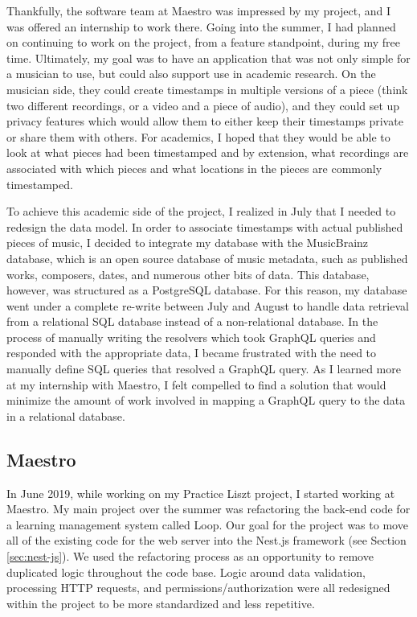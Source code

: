 Thankfully, the software team at Maestro was impressed by my project, and I was offered an internship to work there. Going into the summer, I had planned on continuing to work on the project, from a feature standpoint, during my free time.  Ultimately, my goal was to have an application that was not only simple for a musician to use, but could also support use in academic research. On the musician side, they could create timestamps in multiple versions of a piece (think two different recordings, or a video and a piece of audio), and they could set up privacy features which would allow them to either keep their timestamps private or share them with others.  For academics, I hoped that they would be able to look at what pieces had been timestamped and by extension, what recordings are associated with which pieces and what locations in the pieces are commonly timestamped.

To achieve this academic side of the project, I realized in July that I needed to redesign the data model.  In order to associate timestamps with actual published pieces of music, I decided to integrate my database with the MusicBrainz database, which is an open source database of music metadata, such as published works, composers, dates, and numerous other bits of data.  This database, however, was structured as a PostgreSQL database.  For this reason, my database went under a complete re-write between July and August to handle data retrieval from a relational SQL database instead of a non-relational database.  In the process of manually writing the resolvers which took GraphQL queries and responded with the appropriate data, I became frustrated with the need to manually define SQL queries that resolved a GraphQL query.  As I learned more at my internship with Maestro, I felt compelled to find a solution that would minimize the amount of work involved in mapping a GraphQL query to the data in a relational database.

\subsection{Maestro}
In June 2019, while working on my Practice Liszt project, I started working at Maestro. My main project over the summer was refactoring the back-end code for a learning management system called Loop.  Our goal  for the project was to move all of the existing code for the web server into the Nest.js framework (see Section \ref{sec:nest-js}).  We used the refactoring process as an opportunity to remove duplicated logic throughout the code base.  Logic around data validation, processing HTTP requests, and permissions/authorization were all redesigned within the project to be more standardized and less repetitive.

